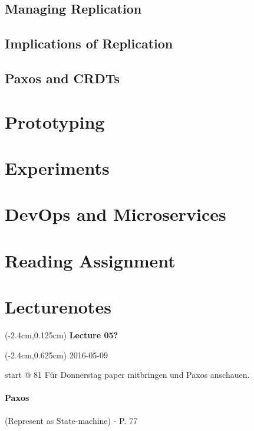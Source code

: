 \documentclass[a4paper,12pt]{article}%
\newcommand{\lecture}[2]{\color{black} 
	
	\begin{textblock*}{3cm}(-2.4cm,0.125cm)
		{\bf Lecture {#1}}
	\end{textblock*}
	
	\begin{textblock*}{3cm}(-2.4cm,0.625cm)
		#2
	\end{textblock*}
}
\begin{document}



\subsection{Managing Replication}
\subsection{Implications of Replication}
\subsection{Paxos and CRDTs}


\section{Prototyping}
\section{Experiments}
\section{DevOps and Microservices}
\section{Reading Assignment}


\newpage
\section{Lecturenotes}
\lecture{05?}{2016-05-09} start @ 81
Für Donnerstag paper mitbringen und Paxos anschauen.

\paragraph{Paxos} (Represent as State-machine) - P. 77
\end{document}
